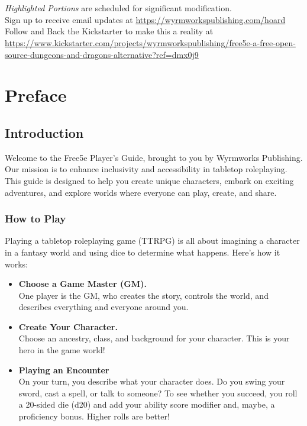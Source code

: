 \section{}

\emph{Highlighted Portions} are scheduled for significant
modification.\\
Sign up to receive email updates at
\url{https://wyrmworkspublishing.com/hoard}\\
Follow and Back the Kickstarter to make this a reality at
\url{https://www.kickstarter.com/projects/wyrmworkspublishing/free5e-a-free-open-source-dungeons-and-dragons-alternative?ref=dmx0j9}

\section{Preface}\label{PlayersGuide_preface}

\subsection{Introduction}\label{Introduction_introduction}

Welcome to the Free5e Player's Guide, brought to you by Wyrmworks
Publishing. Our mission is to enhance inclusivity and accessibility in
tabletop roleplaying. This guide is designed to help you create unique
characters, embark on exciting adventures, and explore worlds where
everyone can play, create, and share.

\subsubsection{How to Play}\label{Introduction_how-to-play}

Playing a tabletop roleplaying game (TTRPG) is all about imagining a
character in a fantasy world and using dice to determine what happens.
Here's how it works:

\begin{itemize}
\item
  \textbf{Choose a Game Master (GM).}\\
  One player is the GM, who creates the story, controls the world, and
  describes everything and everyone around you.
\item
  \textbf{Create Your Character.}\\
  Choose an ancestry, class, and background for your character. This is
  your hero in the game world!
\item
  \textbf{Playing an Encounter}\\
  On your turn, you describe what your character does. Do you swing your
  sword, cast a spell, or talk to someone? To see whether you succeed,
  you roll a 20-sided die (d20) and add your ability score modifier and,
  maybe, a proficiency bonus. Higher rolls are better!
\end{itemize}

